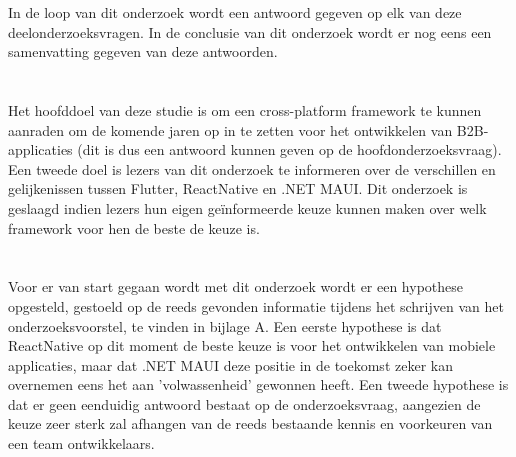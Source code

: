 In de loop van dit onderzoek wordt een antwoord gegeven op elk van deze deelonderzoeksvragen. In de conclusie van dit onderzoek wordt er nog eens een samenvatting gegeven van deze antwoorden.

\section{}
\label{sec:onderzoeksdoelstelling}


Het hoofddoel van deze studie is om een cross-platform framework te kunnen aanraden om de komende jaren op in te zetten voor het ontwikkelen van B2B-applicaties (dit is dus een antwoord kunnen geven op de hoofdonderzoeksvraag). Een tweede doel is lezers van dit onderzoek te informeren over de verschillen en gelijkenissen tussen Flutter, ReactNative en .NET MAUI. Dit onderzoek is geslaagd indien lezers hun eigen geïnformeerde keuze kunnen maken over welk framework voor hen de beste de keuze is.

\section{}
\label{sec:hypothese}

Voor er van start gegaan wordt met dit onderzoek wordt er een hypothese opgesteld, gestoeld op de reeds gevonden informatie tijdens het schrijven van het onderzoeksvoorstel, te vinden in bijlage A. Een eerste hypothese is dat ReactNative op dit moment de beste keuze is voor het ontwikkelen van mobiele applicaties, maar dat .NET MAUI deze positie in de toekomst zeker kan overnemen eens het aan 'volwassenheid' gewonnen heeft. Een tweede hypothese is dat er geen eenduidig antwoord bestaat op de onderzoeksvraag, aangezien de keuze zeer sterk zal afhangen van de reeds bestaande kennis en voorkeuren van een team ontwikkelaars.

\section{}
\label{sec:opzet-bachelorproef}

